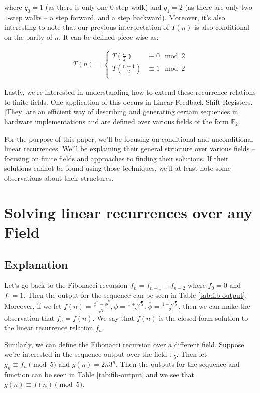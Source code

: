 \documentclass[a4paper]{article}
\theoremstyle{definition}
\begin{document}
where $q_0=1$ (as there is only one $0$-step walk) and $q_1=2$ (as there are only two $1$-step walks --
a step forward, and a step backward). Moreover, it's also interesting to note that our previous
interpretation of $T(n)$ is also conditional on the parity of $n$. It can be defined piece-wise as:

\begin{align*}
T(n)=
\begin{cases}
T\left(\frac{n  }{2}\right) & \equiv 0 \mod 2 \\
T\left(\frac{n-1}{2}\right) & \equiv 1 \mod 2 \\
\end{cases}
\end{align*}

Lastly, we're interested in understanding how to extend these recurrence relations to finite fields. One
application of this occurs in Linear-Feedback-Shift-Registers. [They] are an efficient way of describing
and generating certain sequences in hardware implementations \cite{bib:lfsr} and are defined over
various fields of the form $\mathbb{F}_{2}$.  

For the purpose of this paper, we'll be focusing on conditional and unconditional linear recurrences.
We'll be explaining their general structure over various fields -- focusing on finite fields and
approaches to finding their solutions. If their solutions cannot be found using those techniques, we'll
at least note some observations about their structures.

\section{Solving linear recurrences over any Field}

\subsection{Explanation}
Let's go back to the Fibonacci recursion $f_n=f_{n-1}+f_{n-2}$ where $f_0=0$ and $f_1=1$. Then the
output for the sequence can be seen in Table \ref{tab:fib-output}. Moreover, if we let
$f(n)=\frac{\phi^n-\overline{\phi}^n}{\sqrt{5}}, \phi=\frac{1+\sqrt{5}}{2}, \overline{\phi}=\frac{1-\sqrt{5}}{2}$,
then we can make the observation that $f_n=f(n)$. We say that $f(n)$ is the closed-form solution to the
linear recurrence relation $f_n$. 

Similarly, we can define the Fibonacci recursion over a different field. Suppose we're interested in the
sequence output over the field $\mathbb{F}_5$. Then let $g_n \equiv f_n \pmod 5$ and $g(n)=2n3^n$. Then
the outputs for the sequence and function can be seen in Table \ref{tab:fib-output} and we see that
$g(n) \equiv f(n) \pmod 5$.
\end{document}
